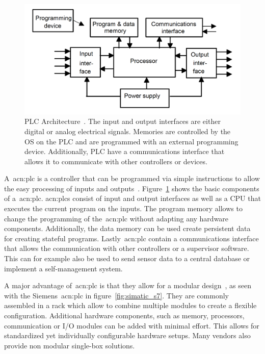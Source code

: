 \begin{figure}
    \includegraphics[width=\textwidth]{Figures/PLC_Architecture.png}
    \caption[PLC Architecture]{
       PLC Architecture~\cite[p.~4]{BOLTON200653}.
    The input and output interfaces are either digital or analog electrical signals.
    Memories are controlled by the OS on the PLC and are programmed with an external programming device.
    Additionally, PLC have a communications interface that allows it to communicate with other controllers or devices.}
    \label{fig:plc_architecture}
\end{figure}

A~\acrfull{acn:plc} is a controller that can be programmed via simple instructions to allow the easy processing of inputs and outputs~\cite[p.~4]{BOLTON200653}.
Figure~\ref{fig:plc_architecture} shows the basic components of a~\acrshort{acn:plc}.
\acrshort{acn:plc}s consist of input and output interfaces as well as a CPU that executes the current program on the inputs.
The program memory allows to change the programming of  the~\acrshort{acn:plc} without adapting any hardware components.
Additionally, the data memory can be used create persistent data for creating stateful programs.
Lastly~\acrshort{acn:plc} contain a communications interface that allows the communication with other controllers or a supervisor software.
This can for example also be used to send sensor data to a central database or implement a self-management system.

A major advantage of~\acrshort{acn:plc} is that they allow for a modular design~\cite[p.~12]{BOLTON200653}, as seen with the Siemens~\acrshort{acn:plc} in figure~\ref{fig:simatic_s7}.
They are commonly assembled in a rack which allow to combine multiple modules to create a flexible configuration.
Additional hardware components, such as memory, processors, communication or I/O modules can be added with minimal effort.
This allows for standardized yet individually configurable hardware setups.
Many vendors also provide non modular single-box solutions.

